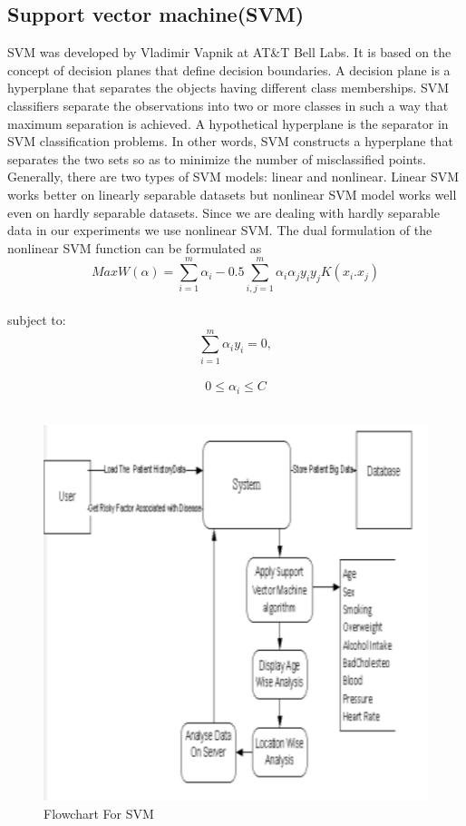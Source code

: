 \documentclass[oneside,12pt]{Classes/VTU}
\begin{document}
    	\subsection{Support vector machine(SVM)}
    	SVM was developed by Vladimir Vapnik at AT\&T Bell Labs. It is based on the concept of decision planes that define decision boundaries. A decision plane is a hyperplane that separates the objects having different class memberships. SVM classifiers separate the observations into two or more classes in such a way that maximum separation is achieved. A hypothetical hyperplane is the separator in SVM classification problems.  In other words, SVM constructs a hyperplane that separates the two sets so as to minimize the number of misclassified points. Generally, there are two types of SVM models: linear and nonlinear. Linear SVM works better on linearly separable datasets but nonlinear SVM model works well even on hardly separable datasets. Since we are dealing with hardly separable data in our experiments we use nonlinear SVM. The dual formulation of the nonlinear SVM function can be formulated as
    	\[ MaxW(\alpha) = \sum_{i=1}^{m}\alpha_i - 0.5\sum_{i, j=1}^{m}\alpha_i \alpha_j y_i y_j K(x_i . x_j) \]\\
    	subject to:
    	\[\sum_{i=1}^{m}\alpha_i y_i = 0 ,\]\\
    	\[ 0 \leq \alpha_i \leq C \]\\
    	\begin{figure}
    		\begin{center}
    			\includegraphics[width=14cm]{images/svm.png}
    			\caption{Flowchart For SVM}
    		\end{center}
    	\end{figure}
\end{document}

